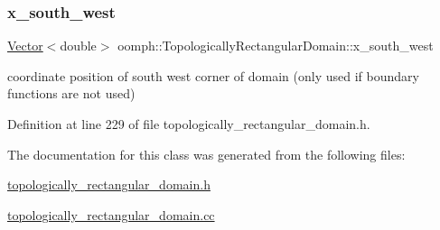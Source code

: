 \subsubsection{\texorpdfstring{x\+\_\+south\+\_\+west}{x\_south\_west}}
{\footnotesize\ttfamily \hyperlink{classoomph_1_1Vector}{Vector}$<$double$>$ oomph\+::\+Topologically\+Rectangular\+Domain\+::x\+\_\+south\+\_\+west\hspace{0.3cm}{\ttfamily [private]}}



coordinate position of south west corner of domain (only used if boundary functions are not used) 



Definition at line 229 of file topologically\+\_\+rectangular\+\_\+domain.\+h.



The documentation for this class was generated from the following files\+:\begin{DoxyCompactItemize}
\item 
\hyperlink{topologically__rectangular__domain_8h}{topologically\+\_\+rectangular\+\_\+domain.\+h}\item 
\hyperlink{topologically__rectangular__domain_8cc}{topologically\+\_\+rectangular\+\_\+domain.\+cc}\end{DoxyCompactItemize}

